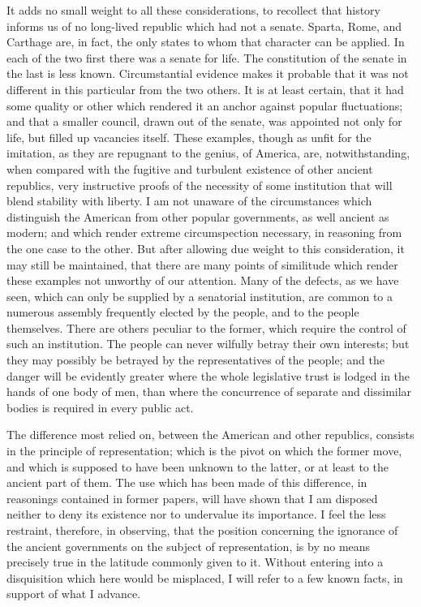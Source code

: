 It adds no small weight to all these considerations, to recollect that history informs us of no long-lived republic which had not a senate. 
Sparta, Rome, and Carthage are, in fact, the only states to whom that character can be applied. 
In each of the two first there was a senate for life. 
The constitution of the senate in the last is less known. 
Circumstantial evidence makes it probable that it was not different in this particular from the two others. 
It is at least certain, that it had some quality or other which rendered it an anchor against popular fluctuations; and that a smaller council, drawn out of the senate, was appointed not only for life, but filled up vacancies itself. 
These examples, though as unfit for the imitation, as they are repugnant to the genius, of America, are, notwithstanding, when compared with the fugitive and turbulent existence of other ancient republics, very instructive proofs of the necessity of some institution that will blend stability with liberty. 
I am not unaware of the circumstances which distinguish the American from other popular governments, as well ancient as modern; and which render extreme circumspection necessary, in reasoning from the one case to the other. 
But after allowing due weight to this consideration, it may still be maintained, that there are many points of similitude which render these examples not unworthy of our attention. 
Many of the defects, as we have seen, which can only be supplied by a senatorial institution, are common to a numerous assembly frequently elected by the people, and to the people themselves. 
There are others peculiar to the former, which require the control of such an institution. 
The people can never wilfully betray their own interests; but they may possibly be betrayed by the representatives of the people; and the danger will be evidently greater where the whole legislative trust is lodged in the hands of one body of men, than where the concurrence of separate and dissimilar bodies is required in every public act.

The difference most relied on, between the American and other republics, consists in the principle of representation; which is the pivot on which the former move, and which is supposed to have been unknown to the latter, or at least to the ancient part of them. 
The use which has been made of this difference, in reasonings contained in former papers, will have shown that I am disposed neither to deny its existence nor to undervalue its importance. 
I feel the less restraint, therefore, in observing, that the position concerning the ignorance of the ancient governments on the subject of representation, is by no means precisely true in the latitude commonly given to it. 
Without entering into a disquisition which here would be misplaced, I will refer to a few known facts, in support of what I advance.

